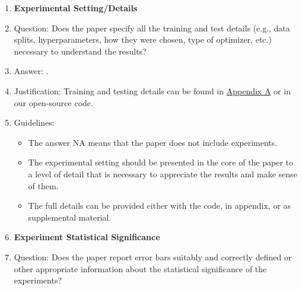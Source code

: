 \documentclass{article}
\begin{document}
\begin{enumerate}
\begin{itemize}
        \item The instructions should contain the exact command and environment needed to run to reproduce the results. See the NeurIPS code and data submission guidelines (\url{https://nips.cc/public/guides/CodeSubmissionPolicy}) for more details.
        \item The authors should provide instructions on data access and preparation, including how to access the raw data, preprocessed data, intermediate data, and generated data, etc.
        \item The authors should provide scripts to reproduce all experimental results for the new proposed method and baselines. If only a subset of experiments are reproducible, they should state which ones are omitted from the script and why.
        \item At submission time, to preserve anonymity, the authors should release anonymized versions (if applicable).
        \item Providing as much information as possible in supplemental material (appended to the paper) is recommended, but including URLs to data and code is permitted.
    \end{itemize}
\item {\bf Experimental Setting/Details}
    \item[] Question: Does the paper specify all the training and test details (e.g., data splits, hyperparameters, how they were chosen, type of optimizer, etc.) necessary to understand the results?
    \item[] Answer: \answerYes{}.
    \item[] Justification: Training and testing details can be found in \hyperref[app:implementation]{Appendix A} or in our open-source code.
    \item[] Guidelines:
    \begin{itemize}
        \item The answer NA means that the paper does not include experiments.
        \item The experimental setting should be presented in the core of the paper to a level of detail that is necessary to appreciate the results and make sense of them.
        \item The full details can be provided either with the code, in appendix, or as supplemental material.
    \end{itemize}
\item {\bf Experiment Statistical Significance}
    \item[] Question: Does the paper report error bars suitably and correctly defined or other appropriate information about the statistical significance of the experiments?

\end{enumerate}
\end{document}
